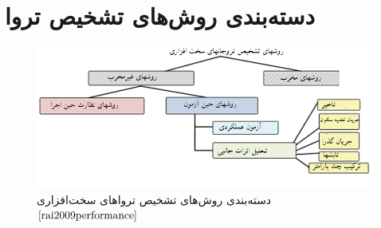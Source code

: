 \section{دسته‌بندی روش‌های تشخیص تروا}
\begin{figure}
	\begin{center}
		\includegraphics[scale=.8]{figs/fig1-4.png}
		\caption[دسته‌بندی روش‌های تشخیص ترواهای سخت‌افزاری]
		{دسته‌بندی روش‌های تشخیص ترواهای سخت‌افزاری
			$\cite{rai2009performance}$}
		\label{fig1-4}
	\end{center}
\end{figure} 

